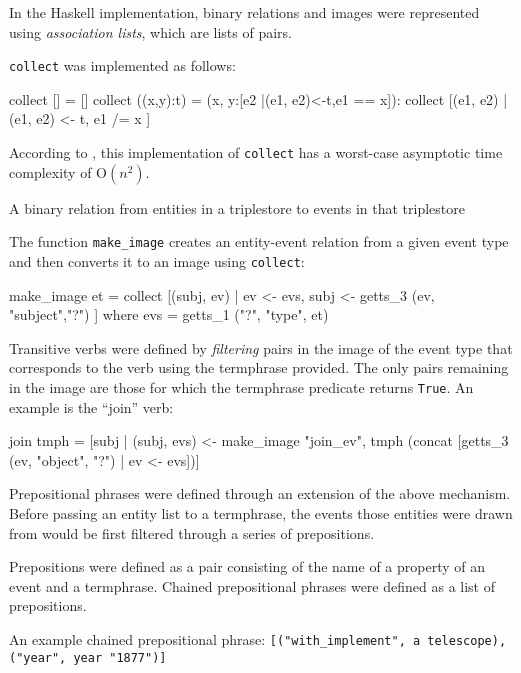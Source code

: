 \documentclass[../main.tex]{subfiles}
\begin{document}
In the Haskell implementation, binary relations and images were represented using {\em association
lists}, which are lists of pairs\cite{frost2014denotational}.

\texttt{collect} was implemented as follows:

\begin{code}
collect [] = []
collect ((x,y):t) = (x, y:[e2 |(e1, e2)<-t,e1 == x]): collect [(e1, e2) | (e1, e2) <- t, e1 /= x ]
\end{code}

According to \cite{agboola2015extensible}, this implementation of \texttt{collect} has a worst-case asymptotic time complexity of
O$(n^2)$.

\begin{definition}
  A binary relation from entities in a triplestore to events in that triplestore
\end{definition}

The function \texttt{make\_image} creates an entity-event relation from a given event type and then converts it to an image using \texttt{collect}:

\begin{code}
  make_image et = collect [(subj, ev) | ev <- evs, subj <- getts_3 (ev, "subject","?") ]
    where evs = getts_1 ("?", "type",  et)
\end{code}

Transitive verbs were defined by {\em filtering} pairs in the image of the event
type that corresponds to the verb using the termphrase provided.  The only pairs remaining in the image are those
for which the termphrase predicate returns \texttt{True}.  An example is the
``join'' verb:

\begin{code}
  join tmph = [subj | (subj, evs) <- make_image "join_ev",
       tmph (concat [getts_3 (ev,  "object", "?") | ev <- evs])]
\end{code}

Prepositional phrases were defined through an extension of the above
mechanism.  Before passing an entity list to a termphrase, the events
those entities were drawn from would be first filtered through a series
of prepositions.

Prepositions were defined as a pair consisting of the name of a property
of an event and a termphrase.  Chained prepositional phrases were defined
as a list of prepositions.

An example chained prepositional phrase: \texttt{[("with\_implement", a
telescope), ("year", year "1877")]}
\end{document}
